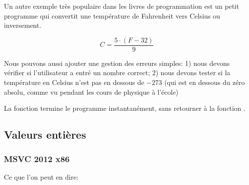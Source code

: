 ﻿

Un autre exemple très populaire dans
les livres de programmation est un petit programme qui convertit une température de Fahrenheit vers Celsius ou inversement.

\[
	C=\frac{5 \cdot (F-32)}{9}
\]

Nous pouvons aussi ajouter une gestion des erreurs simples:
1) nous devons vérifier si l'utilisateur a entré un nombre correct;
2) nous devons tester si la température en Celsius n'est pas en dessous de $-273$ 
(qui est en dessous du zéro absolu, comme vu pendant les cours de physique à l'école)

La fonction  termine 
le programme instantanément, sans retourner à la fonction .

\subsection{Valeurs entières}



\subsubsection{MSVC 2012 x86 \Optimizing}



Ce que l'on peut en dire:

